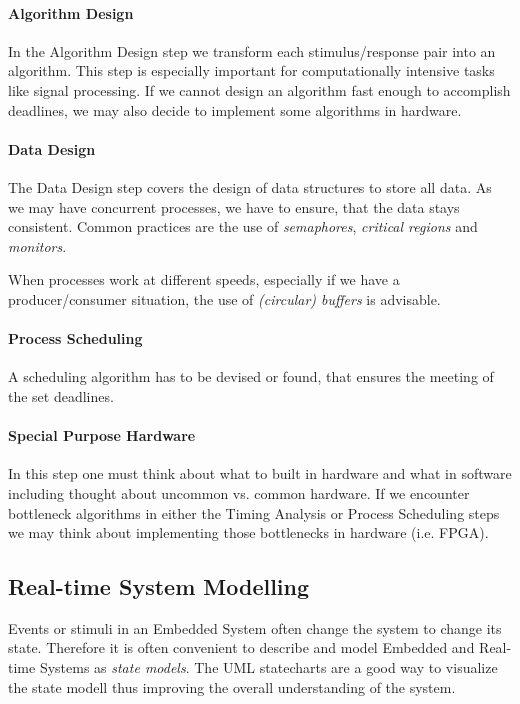 \documentclass[10pt,a4paper,titlepage,draft]{article} %
\begin{document}
\paragraph{Algorithm Design}
In the Algorithm Design step we transform each stimulus/response pair into an algorithm.
This step is especially important for computationally intensive tasks like signal processing.
If we cannot design an algorithm fast enough to accomplish deadlines, we may also decide to implement some algorithms in hardware.

\paragraph{Data Design}
The Data Design step covers the design of data structures to store all data.
As we may have concurrent processes, we have to ensure, that the data stays consistent.
Common practices are the use of \emph{semaphores}, \emph{critical regions} and \emph{monitors}.

When processes work at different speeds, especially if we have a pro\-du\-cer/con\-sumer situation, the use of \emph{(circular) buffers} is advisable.

\paragraph{Process Scheduling}
A scheduling algorithm has to be devised or found, that ensures the meeting of the set deadlines.

\paragraph{Special Purpose Hardware}
In this step one must think about what to built in hardware and what in software including thought about uncommon vs. common hardware.
If we encounter bottleneck algorithms in either the Timing Analysis or Process Scheduling steps we may think about implementing those bottlenecks in hardware (i.e. FPGA).

\subsection{Real-time System Modelling}
Events or stimuli in an Embedded System often change the system to change its state.
Therefore it is often convenient to describe and model Embedded and Real-time Systems as \emph{state models}.
The UML statecharts are a good way to visualize the state modell thus improving the overall understanding of the system.
\end{document}
